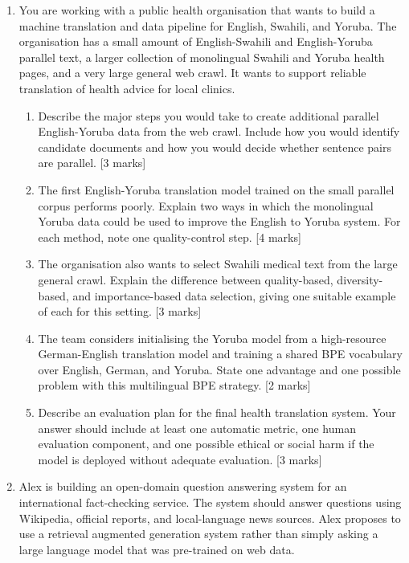 \documentclass[11pt,a4paper]{article}
\newcommand{\pts}[1]{\hfill [#1 marks]}
\begin{document}
\begin{enumerate}[leftmargin=*]

\item You are working with a public health organisation that wants to build a machine translation and data pipeline for English, Swahili, and Yoruba. The organisation has a small amount of English-Swahili and English-Yoruba parallel text, a larger collection of monolingual Swahili and Yoruba health pages, and a very large general web crawl. It wants to support reliable translation of health advice for local clinics.

\begin{enumerate}
\item Describe the major steps you would take to create additional parallel English-Yoruba data from the web crawl. Include how you would identify candidate documents and how you would decide whether sentence pairs are parallel. \pts{3}

\item The first English-Yoruba translation model trained on the small parallel corpus performs poorly. Explain two ways in which the monolingual Yoruba data could be used to improve the English to Yoruba system. For each method, note one quality-control step. \pts{4}

\item The organisation also wants to select Swahili medical text from the large general crawl. Explain the difference between quality-based, diversity-based, and importance-based data selection, giving one suitable example of each for this setting. \pts{3}

\item The team considers initialising the Yoruba model from a high-resource German-English translation model and training a shared BPE vocabulary over English, German, and Yoruba. State one advantage and one possible problem with this multilingual BPE strategy. \pts{2}

\item Describe an evaluation plan for the final health translation system. Your answer should include at least one automatic metric, one human evaluation component, and one possible ethical or social harm if the model is deployed without adequate evaluation. \pts{3}
\end{enumerate}

\newpage

\item Alex is building an open-domain question answering system for an international fact-checking service. The system should answer questions using Wikipedia, official reports, and local-language news sources. Alex proposes to use a retrieval augmented generation system rather than simply asking a large language model that was pre-trained on web data.


\end{enumerate}
\end{document}
